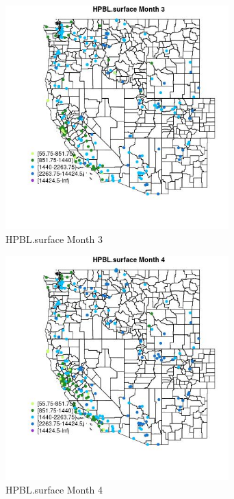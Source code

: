 \begin{figure} 
\centering  
\includegraphics[width=0.77\textwidth]{Code_Outputs/Report_ML_input_PM25_Step4_part_e_de_duplicated_aveswNAs_MapObsMo3HPBLsurface.jpg} 
\caption{\label{fig:Report_ML_input_PM25_Step4_part_e_de_duplicated_aveswNAsMapObsMo3HPBLsurface}HPBL.surface Month 3} 
\end{figure} 
 

\clearpage 

\begin{figure} 
\centering  
\includegraphics[width=0.77\textwidth]{Code_Outputs/Report_ML_input_PM25_Step4_part_e_de_duplicated_aveswNAs_MapObsMo4HPBLsurface.jpg} 
\caption{\label{fig:Report_ML_input_PM25_Step4_part_e_de_duplicated_aveswNAsMapObsMo4HPBLsurface}HPBL.surface Month 4} 
\end{figure} 
 

